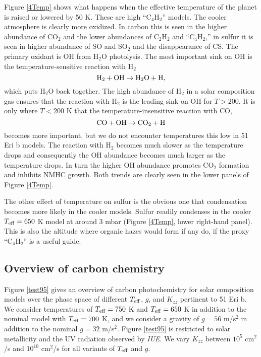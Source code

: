 \documentclass[preprint]{aastex}
\newcounter{reaction}
\begin{document}
Figure \ref{4Temp} shows what happens when the effective temperature of the planet is raised or lowered by 50 K.
These are high ``C$_4$H$_2$'' models. %
The cooler atmosphere is clearly more oxidized.
In carbon this is seen in the higher abundance of CO$_2$ and the lower abundances of C$_2$H$_2$ and ``C$_4$H$_2$,''
in sulfur it is seen in higher abundance of SO and SO$_2$ and the disappearance of CS.
The primary oxidant is OH from H$_2$O photolysis.
The most important sink on OH is the temperature-sensitive reaction with H$_2$
\[
{\rm H}_2 + {\rm OH} \rightarrow {\rm H}_2{\rm O} + {\rm H},
\]
which puts H$_2$O back together.
The high abundance of H$_2$ in a solar composition gas ensures that the 
reaction with H$_2$ is the leading sink on OH for $T>200$.
It is only where $T< 200$ K that the temperature-insensitive reaction with CO,
\[
{\rm CO} + {\rm OH} \rightarrow {\rm CO}_2+ {\rm H} 
\]
becomes more important, but we do not encounter temperatures this low in 51 Eri b models.
The reaction with H$_2$ becomes much slower as the temperature drops and consequently the OH
abundance becomes much larger as the temperature drops.
In turn the higher OH abundance promotes CO$_2$ formation and inhibits NMHC growth.
Both trends are clearly seen in the lower panels of Figure \ref{4Temp}. 

The other effect of temperature on sulfur is the obvious one that condensation becomes more likely in the cooler models.
Sulfur readily condenses in the cooler $T_{\rm eff}=650$ K model at around 3 mbar (Figure \ref{4Temp}, lower right-hand panel). 
This is also the altitude where organic hazes would form if any do,
if the proxy ``C$_4$H$_2$'' is a useful guide. 

\subsection{Overview of carbon chemistry}

Figure \ref{test95} gives an overview of carbon photochemistry for solar composition
models over the phase space of different $T_{\rm eff}$, $g$, and $K_{zz}$ pertinent to 51 Eri b.  
We consider temperatures of $T_{\rm eff}=750$ K and $T_{\rm eff}=650$ K
in addition to the nominal model with $T_{\rm eff}=700$ K,
and we consider a gravity of $g=56$ m/s$^2$ in addition to the nominal $g=32$ m/s$^2$.
Figure \ref{test95} is restricted to solar metallicity and the {UV} radiation observed by {\it IUE}.
We vary $K_{zz}$ between $10^5$ cm$^2$/s and $10^{10}$ cm$^2$/s for all variants of $T_{\rm eff}$ and $g$. 
\end{document}

